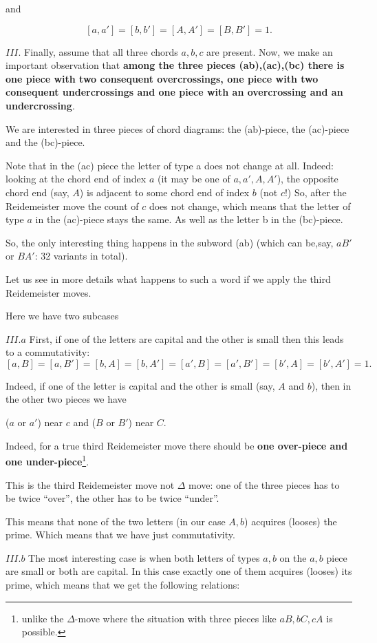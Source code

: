 \documentclass[12pt]{article}
\theoremstyle{definition}
\theoremstyle{remark}
\begin{document}
and

$$[a,a']=[b,b']=[A,A']=[B,B']=1.$$

$III.$ Finally, assume that all three chords $a,b,c$ are present.
Now, we make an important observation that
{\bf among the three pieces (ab),(ac),(bc) there is one piece with two consequent overcrossings,
one piece with two consequent undercrossings and one piece with an overcrossing and an undercrossing}.



 We are interested in three pieces of chord diagrams:
the (ab)-piece, the (ac)-piece and the (bc)-piece.

Note that in the (ac) piece the letter of type a does not change at all.
Indeed: looking at the chord end of index $a$ (it may be one of $a,a', A,A'$),
the opposite chord end (say, $A$) is adjacent to some chord end of index $b$ (not $c$!)
So, after the Reidemeister move the count of $c$ does not change,
which means that the letter of type $a$
in the (ac)-piece stays the same.
As well as the letter b in the (bc)-piece.

So, the only interesting thing happens in the subword
(ab) (which can be,say, $aB'$ or $BA'$: 32 variants in total).

Let us see in more details what happens to such a word if we apply the third Reidemeister moves.

Here we have two subcases

$III.a$ First, if one of the letters are capital and the other is small then this leads to a commutativity:
$[a,B]=[a,B']=[b,A]=[b,A']=[a',B]=[a',B']=[b',A]=[b',A']=1.$


Indeed, if one of the letter is capital and the other is small (say, $A$ and $b$), then in the other two
pieces we have

($a$ or $a'$) near $c$
and
($B$ or $B'$) near $C.$

Indeed, for a true third Reidemeister move there should be {\bf one over-piece and one under-piece}\footnote{
unlike the $\Delta$-move where the
situation with three pieces like
$aB, bC, cA$ is possible.}.

This is the third Reidemeister move not $\Delta$ move: one of the three pieces has to be twice ``over'', the other
has to be twice ``under''.

This means that none of the two letters (in our case $A,b$) acquires (looses) the prime.
Which means that we have just commutativity.

$III.b$ The most interesting case is when both letters of types $a,b$ on the $a,b$ piece are small
or both are capital.
In this case exactly one of them acquires (looses) its prime, which means that we get the following  relations:
\end{document}
